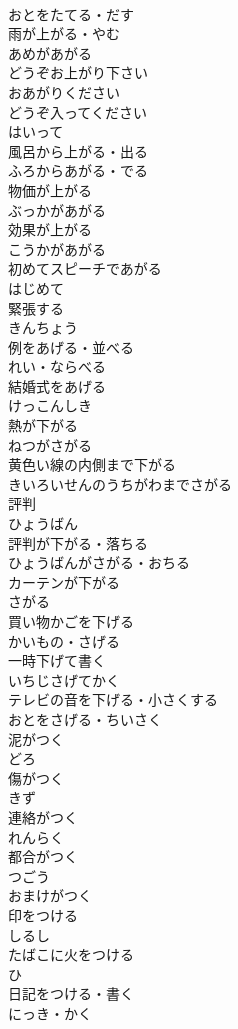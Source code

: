 \documentclass[8pt]{extreport}
\begin{document}
\begin{CJK}{UTF8}{min}
\\	おとをたてる・だす
\\	雨が上がる・やむ	
\\	あめがあがる
\\	どうぞお上がり下さい	
\\	おあがりください
\\	どうぞ入ってください	
\\	はいって
\\	風呂から上がる・出る	
\\	ふろからあがる・でる
\\	物価が上がる	
\\	ぶっかがあがる
\\	効果が上がる	
\\	こうかがあがる
\\	初めてスピーチであがる	
\\	はじめて
\\	緊張する	
\\	きんちょう
\\	例をあげる・並べる	
\\	れい・ならべる
\\	結婚式をあげる	
\\	けっこんしき
\\	熱が下がる	
\\	ねつがさがる
\\	黄色い線の内側まで下がる	
\\	きいろいせんのうちがわまでさがる
\\	評判	
\\	ひょうばん
\\	評判が下がる・落ちる	
\\	ひょうばんがさがる・おちる
\\	カーテンが下がる	
\\	さがる
\\	買い物かごを下げる	
\\	かいもの・さげる
\\	一時下げて書く	
\\	いちじさげてかく
\\	テレビの音を下げる・小さくする	
\\	おとをさげる・ちいさく
\\	泥がつく	
\\	どろ
\\	傷がつく	
\\	きず
\\	連絡がつく	
\\	れんらく
\\	都合がつく	
\\	つごう
\\	おまけがつく	
\\	印をつける	
\\	しるし
\\	たばこに火をつける	
\\	ひ
\\	日記をつける・書く	
\\	にっき・かく
\end{CJK}
\end{document}
